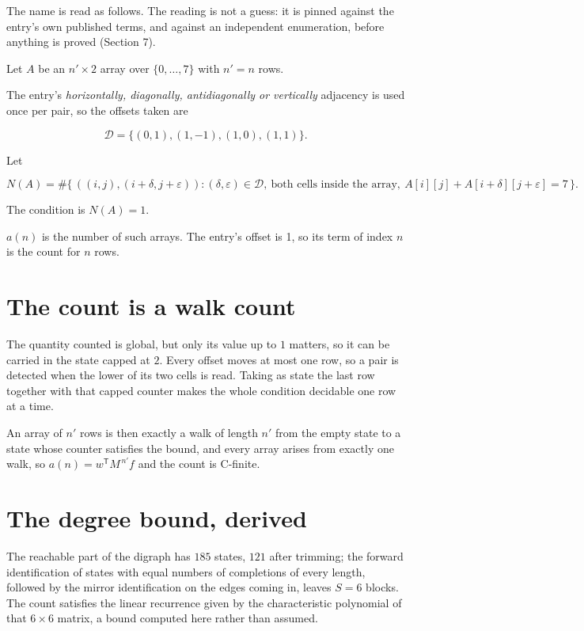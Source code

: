 \documentclass[11pt]{article}
\theoremstyle{definition}
\begin{document}
The name is read as follows. The reading is not a guess: it is pinned against the entry's own published terms, and against an independent enumeration, before anything is proved (Section 7).

Let $A$ be an $n' \times 2$ array over $\{0,\dots,7\}$ with $n' = n$ rows.

The entry's {\itshape horizontally, diagonally, antidiagonally or vertically} adjacency is used once per pair, so the offsets taken are

\[\mathcal{D} = \{(0,1), (1,-1), (1,0), (1,1)\}.\]

Let

\[N(A) = \#\bigl\{\,((i,j),(i{+}\delta,j{+}\varepsilon)) : (\delta,\varepsilon) \in \mathcal{D},\ \text{both cells inside the array},\ A[i][j] + A[i{+}\delta][j{+}\varepsilon] = 7\,\bigr\}.\]

The condition is $N(A) = 1$.

$a(n)$ is the number of such arrays. The entry's offset is 1, so its term of index $n$ is the count for $n$ rows.

\section{The count is a walk count}

The quantity counted is global, but only its value up to $1$ matters, so it can be carried in the state capped at $2$. Every offset moves at most one row, so a pair is detected when the lower of its two cells is read. Taking as state the last row together with that capped counter makes the whole condition decidable one row at a time.

An array of $n'$ rows is then exactly a walk of length $n'$ from the empty state to a state whose counter satisfies the bound, and every array arises from exactly one walk, so $a(n) = w^{\mathsf T}M^{\,n'}f$ and the count is C-finite.

\section{The degree bound, derived}

The reachable part of the digraph has $185$ states, $121$ after trimming; the forward identification of states with equal numbers of completions of every length, followed by the mirror identification on the edges coming in, leaves $S = 6$ blocks. The count satisfies the linear recurrence given by the characteristic polynomial of that $6\times6$ matrix, a bound computed here rather than assumed.
\end{document}
